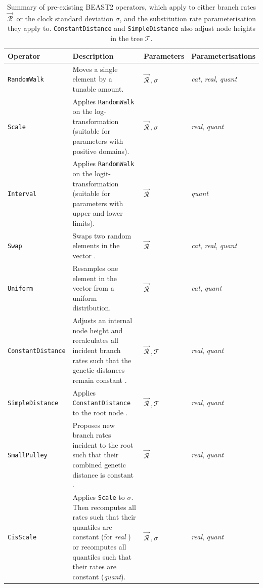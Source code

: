 \documentclass[10pt,letterpaper]{article}
\begin{document}
\begin{table}[h!]
\centering
\begin{tabular}{|l p{4.2cm} l l|} 
 \hline
 Operator & Description & Parameters & Parameterisations  \\
  \hline
 \texttt{RandomWalk} & Moves a single element by a tunable amount. & $\vec{\mathcal{R}}^{\,}, \sigma$ & \textit{cat}, \textit{real}, \textit{quant} \\
  \hline
\texttt{Scale} & Applies \texttt{RandomWalk} on the log-transformation (suitable for parameters with positive domains). & $\vec{\mathcal{R}}^{\,}, \sigma$ & \textit{real}, \textit{quant}  \\
  \hline
 \texttt{Interval} & Applies \texttt{RandomWalk} on the logit-transformation (suitable for parameters with upper and lower limits). & $\vec{\mathcal{R}}^{\,}$ & \textit{quant}  \\
  \hline
 \texttt{Swap} & Swaps two random elements in the vector \cite{drummond2006relaxed}. & $\vec{\mathcal{R}}^{\,}$  & \textit{cat}, \textit{real}, \textit{quant}  \\
 \hline
\texttt{Uniform} & Resamples one element in the vector from a uniform distribution. & $\vec{\mathcal{R}}^{\,}$  & \textit{cat}, \textit{quant}  \\
 \hline
\texttt{ConstantDistance} & Adjusts an internal node height and recalculates all incident branch rates such that the genetic distances remain constant \cite{zhang2020improving}.  & $\vec{\mathcal{R}}^{\,}, \mathcal{T}$ & \textit{real}, \textit{quant} \\
 \hline
\texttt{SimpleDistance} & Applies \texttt{ConstantDistance} to the root node \cite{zhang2020improving}.  & $\vec{\mathcal{R}}^{\,}, \mathcal{T}$ & \textit{real}, \textit{quant} \\
 \hline
\texttt{SmallPulley} & Proposes new branch rates incident to the root such that their combined genetic distance is constant  \cite{zhang2020improving}.  & $\vec{\mathcal{R}}^{\,}$ & \textit{real}, \textit{quant} \\
 \hline
\texttt{CisScale} & Applies \texttt{Scale} to $\sigma$. Then recomputes all rates such that their quantiles are constant (for \textit{real} \cite{zhang2020improving}) or recomputes all quantiles such that their rates are constant (\textit{quant}).  & $\vec{\mathcal{R}}^{\,}, \sigma$ & \textit{real}, \textit{quant} \\
 \hline
\end{tabular}
\caption{Summary of pre-existing BEAST2 operators, which apply to either branch rates $\vec{\mathcal{R}}^{\,}$ or the clock standard deviation $\sigma$, and the substitution rate parameterisation they apply to.
 \texttt{ConstantDistance} and \texttt{SimpleDistance} also adjust node heights in the tree $\mathcal{T}$. }
\label{table:kernels}
\end{table}
\end{document}
